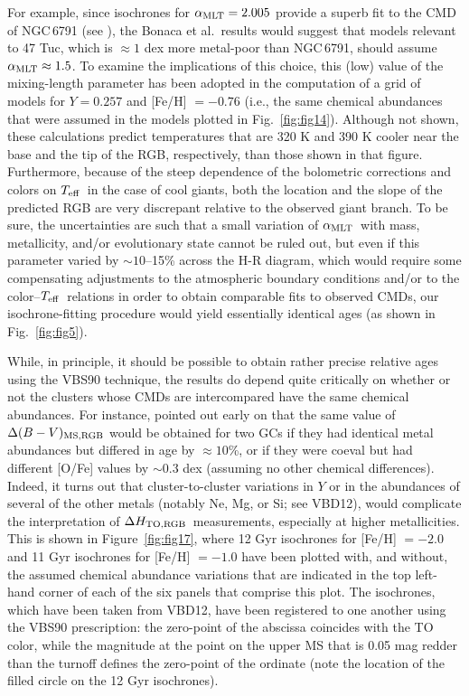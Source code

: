 \documentclass[12pt,preprint]{aastex}
\newcommand\teff{{T_{\rm eff}}}
\newcommand\amlt{{\alpha_{\rm MLT}}}
\newcommand\delc{\Delta H_{\rm TO,RGB}}
\begin{document}
For example, since isochrones for $\amlt = 2.005$ provide a superb
fit to the CMD of NGC$\,$6791 (see \citealt{bvb12}), the Bonaca et al.~results
would suggest that models relevant to 47 Tuc, which is $\approx 1$ dex more
metal-poor than NGC$\,$6791, should assume $\amlt \approx 1.5$.  To
examine the implications of this choice, this (low) value of the mixing-length
parameter has been adopted in the computation of a grid of models for $Y =
0.257$ and [Fe/H] $= -0.76$ (i.e., the same chemical abundances that were
assumed in the models plotted in Fig.~\ref{fig:fig14}).  Although not shown,
these calculations predict temperatures that are 320 K and 390 K cooler near the
base and the tip of the RGB, respectively, than those shown in that figure.
Furthermore, because of the steep dependence of the
bolometric corrections and colors on $\teff$\ in the case of cool giants, both
the location and the slope of the predicted RGB are very discrepant relative to
the observed giant branch.  To be sure, the uncertainties are such that a small
variation of $\amlt$\ with mass, metallicity, and/or evolutionary
state cannot be ruled out, but even if this parameter varied by $\sim 10$--15\%
across the H-R diagram, which would require some compensating adjustments to the
atmospheric boundary conditions and/or to the color--$\teff$\ relations in order
to obtain comparable fits to observed CMDs, our isochrone-fitting procedure
would yield essentially identical ages (as shown in Fig.~\ref{fig:fig5}).

While, in principle, it should be possible to obtain rather precise relative
ages using the VBS90 technique, the results do depend quite critically on
whether or not the clusters whose CMDs are intercompared have the same chemical
abundances.  For instance, \citet{vs91} pointed out early on that the same value
of $\Delta(B-V)_{\rm MS,RGB}$ would be obtained for two GCs if they had
identical metal abundances but differed in age by $\approx 10$\%, or if they
were coeval but had different [O/Fe] values by $\sim 0.3$ dex (assuming no other
chemical differences).  Indeed, it turns out that cluster-to-cluster variations
in $Y$ or in the abundances of several of the other metals (notably Ne, Mg, or
Si; see VBD12), would complicate the interpretation of $\delc$\ measurements,
especially at higher metallicities.  This is shown in Figure~\ref{fig:fig17},
where 12 Gyr isochrones for [Fe/H] $= -2.0$ and 11 Gyr isochrones for [Fe/H] $=
-1.0$ have been plotted with, and without, the assumed chemical abundance
variations that are indicated in the top left-hand corner of each of the six
panels that comprise this plot.  The isochrones, which have been taken from
VBD12, have been registered to one another using the VBS90
prescription: the zero-point of the abscissa coincides with the TO color, while
the magnitude at the point on the upper MS that is 0.05 mag redder than the
turnoff defines the zero-point of the ordinate (note the location of the filled
circle on the 12 Gyr isochrones).
\end{document}
